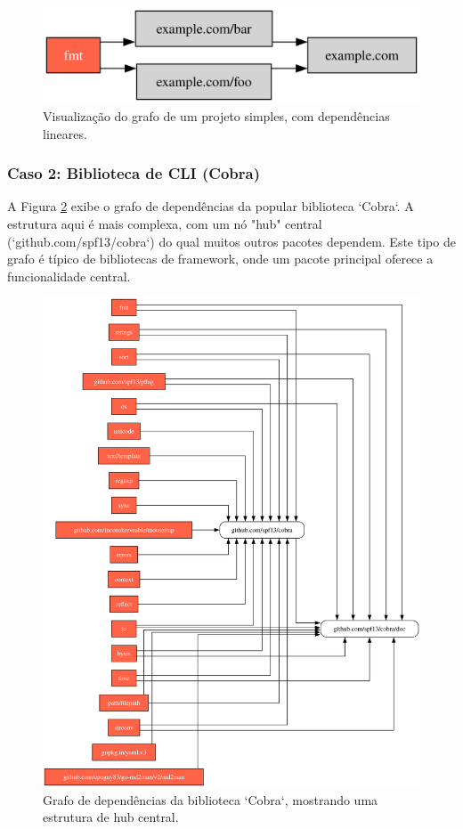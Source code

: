 \documentclass[12pt]{article}
\begin{document}
\begin{figure}[htbp] 
\centering
\includegraphics[width=1\textwidth]{examples/example.com.png}
\caption{Visualização do grafo de um projeto simples, com dependências lineares.}
\label{fig:grafoExemplo}
\end{figure}

\subsubsection{Caso 2: Biblioteca de CLI (Cobra)}
A Figura \ref{fig:exemplo-2} exibe o grafo de dependências da popular biblioteca `Cobra`. A estrutura aqui é mais complexa, com um nó "hub" central (`github.com/spf13/cobra`) do qual muitos outros pacotes dependem. Este tipo de grafo é típico de bibliotecas de framework, onde um pacote principal oferece a funcionalidade central.

\begin{figure}[htbp] 
\centering
\includegraphics[width=1\textwidth]{examples/github.com_spf13_cobra.png}
\caption{Grafo de dependências da biblioteca `Cobra`, mostrando uma estrutura de hub central.}
\label{fig:exemplo-2}
\end{figure}
\end{document}

